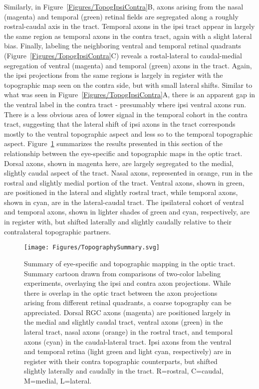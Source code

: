 Similarly, in Figure~\ref{Figures/TopogIpsiContra}B, axons arising from the nasal (magenta) and temporal (green) retinal fields are segregated along a roughly rostral-caudal axis in the tract.
Temporal axons in the ipsi tract appear in largely the same region as temporal axons in the contra tract, again with a slight lateral bias.
Finally, labeling the neighboring ventral and temporal retinal quadrants (Figure~\ref{Figures/TopogIpsiContra}C) reveals a rostal-lateral to caudal-medial segregation of ventral (magenta) and temporal (green) axons in the tract.
Again, the ipsi projections from the same regions is largely in register with the topographic map seen on the contra side, but with small lateral shifts.
Similar to what was seen in Figure~\ref{Figures/TopogIpsiContra}A, there is an apparent gap in the ventral label in the contra tract - presumably where ipsi ventral axons run.
There is a less obvious area of lower signal in the temporal cohort in the contra tract, suggesting that the lateral shift of ipsi axons in the tract corresponds mostly to the ventral topographic aspect and less so to the temporal topographic aspect.
Figure~\ref{Figures/TopographySummary} summarizes the results presented in this section of the relationship between the eye-specific and topographic maps in the optic tract.
Dorsal axons, shown in magenta here, are largely segregated to the medial, slightly caudal aspect of the tract.
Nasal axons, represented in orange, run in the rostral and slightly medial portion of the tract.
Ventral axons, shown in green, are positioned in the lateral and slightly rostral tract, while temporal axons, shown in cyan, are in the lateral-caudal tract.
The ipsilateral cohort of ventral and temporal axons, shown in lighter shades of green and cyan, respectively, are in register with, but shifted laterally and slightly caudally relative to their contralateral topographic partners.

\begin{figure}[hbtp]
	\begin{center}
		\texttt{[image: Figures/TopographySummary.svg]}
		\caption[Summary of eye-specific and topographic mapping in the optic tract.]
		{Summary of eye-specific and topographic mapping in the optic tract.
		Summary cartoon drawn from comparisons of two-color labeling experiments, overlaying the ipsi and contra axon projections.
		While there is overlap in the optic tract between the axon projections arising from different retinal quadrants, a coarse topography can be appreciated.
		Dorsal RGC axons (magenta) are positioned largely in the medial and slightly caudal tract, ventral axons (green) in the lateral tract, nasal axons (orange) in the rostral tract, and temporal axons (cyan) in the caudal-lateral tract.
		Ipsi axons from the ventral and temporal retina (light green and light cyan, respectively) are in register with their contra topographic counterparts, but shifted slightly laterally and caudally in the tract.
		R=rostral, C=caudal, M=medial, L=lateral.}
		\label{Figures/TopographySummary}
	\end{center}
\end{figure}